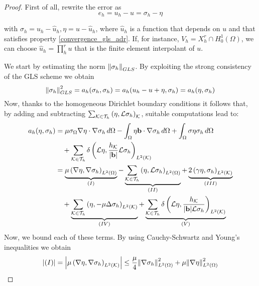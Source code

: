 \begin{proof}
    First of all, rewrite the error as 
    \begin{equation}
        e_h = u_h - u = \sigma_h - \eta
        \label{error_rewrite_adr}
    \end{equation}
    
    with \(\sigma_h = u_h - \hat{u}_h, \eta = u - \hat{u}_h\), where \(\hat{u}_h\) is a function that depends on \(u\) and that satisfies property \eqref{convergence_gls_adr}. If, for instance, \(V_h = X_h^r \cap H^1_0(\Omega)\), we can choose \(\hat{u}_h = \prod_{h}^{r} u\) that is the finite element interpolant of \(u\). 

    We start by estimating the norm \(\norm{\sigma_h}_{GLS}\). By exploiting the strong consistency of the GLS scheme we obtain 
    \[
        \norm{\sigma_h}^2_{GLS} = a_h(\sigma_h, \sigma_h) = a_h(u_h - u +\eta, \sigma_h) = a_h(\eta, \sigma_h)
    \]
    Now, thanks to the homogeneous Dirichlet boundary conditions it follows that, by adding and subtracting \(\sum_{{\mathcal{K}\in\mathcal{T}_h}}\left(\eta, \mathcal{L}\sigma_h\right)_{\mathcal{K}}\), suitable computations lead to:
    \begin{align*}
        a_h(\eta, \sigma_h) &= \mu \sigma_\Omega \nabla \eta \cdot \nabla \sigma_h \, d\Omega - \int_\Omega \eta \textbf{b} \cdot \nabla \sigma_h \, d\Omega + \int_\Omega \sigma \eta \sigma_h \, d\Omega \\
        & \quad + \sum_{\mathcal{K}\in\mathcal{T}_h} \delta \left( \mathcal{L}\eta, \frac{h_{\mathcal{K}}}{\abs{\textbf{b}}}\mathcal{L}\sigma_h \right)_{L^2(\mathcal{K})} \\
        &= \underbrace{\mu\left( \nabla \eta, \nabla \sigma_h \right)_{L^2(\Omega)}}_{(I)} - \underbrace{\sum_{\mathcal{K}\in\mathcal{T}_h} \left(\eta, \mathcal{L}\sigma_h\right)_{L^2(\Omega)}}_{(II)} + \underbrace{2\left( \gamma \eta, \sigma_h \right)_{L^2(\mathcal{K})}}_{(III)} \\
        &\quad + \underbrace{\sum_{\mathcal{K}\in\mathcal{T}_h} \left( \eta, -\mu\Delta \sigma_h \right)_{L^2(\mathcal{K})}}_{(IV)} + \underbrace{\sum_{\mathcal{K}\in\mathcal{T}_h} \delta \left( \mathcal{L}\eta, \frac{h_{\mathcal{K}}}{\abs{\textbf{b}}\mathcal{L}\sigma_h} \right)_{L^2(\mathcal{K})}}_{(V)} 
    \end{align*}
    Now, we bound each of these terms. By using Cauchy-Schwartz and Young's inequalities we obtain 
    {
        \allowdisplaybreaks
        \begin{align*}
        \abs{(I)} &= \abs{\mu\left( \grad \eta, \grad \sigma_h \right)_{L^2(\element)}} \leq \frac{\mu}{4} \ltwonorm{\grad \sigma_h}^2 + \mu \ltwonorm{\grad \eta}^2 \\

\end{align*}}
\end{proof}
